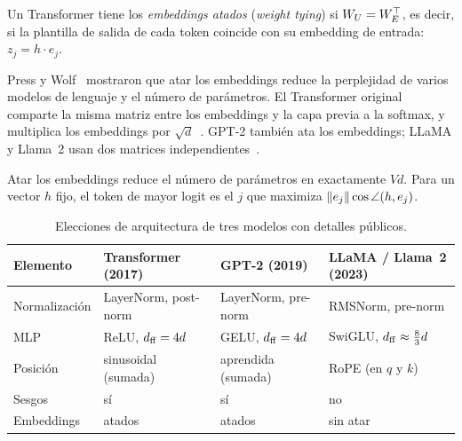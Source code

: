 \begin{definicion}\label{def:atados}
Un Transformer tiene los \emph{embeddings atados} (\emph{weight tying}) si $W_U=W_E^{\top}$, es decir, si la plantilla de salida de cada token coincide con su embedding de entrada: $z_j=h\cdot e_j$.
\end{definicion}

Press y Wolf~\cite{presswolf} mostraron que atar los embeddings reduce la perplejidad de varios modelos de lenguaje y el número de parámetros. El Transformer original comparte la misma matriz entre los embeddings y la capa previa a la softmax, y multiplica los embeddings por $\sqrt{d}$~\cite[§3.4]{vaswani}. GPT-2 también ata los embeddings; LLaMA y Llama~2 usan dos matrices independientes~\cite{llamacode}.

\begin{proposicion}\label{prop:ahorro}
Atar los embeddings reduce el número de parámetros en exactamente $Vd$. Para un vector $h$ fijo, el token de mayor logit es el $j$ que maximiza $\lVert e_j\rVert\cos\angle(h,e_j)$.
\end{proposicion}

\begin{table}[ht]
\centering\small
\caption{Elecciones de arquitectura de tres modelos con detalles públicos.}\label{tab:modelos}
\begin{tabular}{@{}llll@{}}
\toprule
Elemento & Transformer (2017) & GPT-2 (2019) & LLaMA / Llama~2 (2023) \\
\midrule
Normalización & LayerNorm, post-norm & LayerNorm, pre-norm & RMSNorm, pre-norm \\
MLP & ReLU, $d_{\mathrm{ff}}=4d$ & GELU, $d_{\mathrm{ff}}=4d$ & SwiGLU, $d_{\mathrm{ff}}\approx\tfrac83 d$ \\
Posición & sinusoidal (sumada) & aprendida (sumada) & RoPE (en $q$ y $k$) \\
Sesgos & sí & sí & no \\
Embeddings & atados & atados & sin atar \\
\bottomrule
\end{tabular}
\end{table}

\addtocounter{definicion}{1}%

